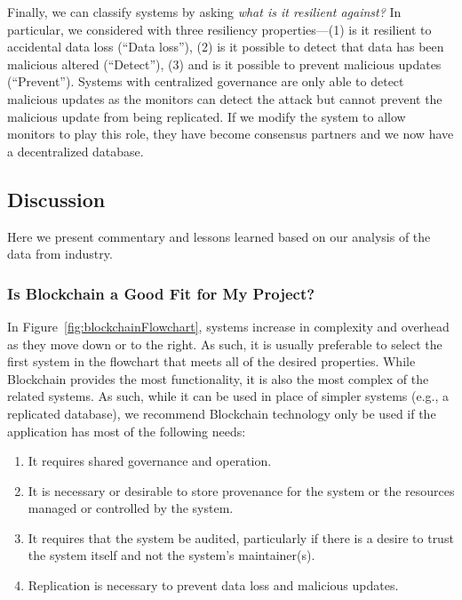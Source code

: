Finally, we can classify systems by asking \emph{what is it resilient against?}
In particular, we considered with three resiliency properties---(1) is it resilient to accidental data loss (``Data loss''), (2) is it possible to detect that data has been malicious altered (``Detect''), (3) and is it possible to prevent malicious updates (``Prevent'').
Systems with centralized governance are only able to detect malicious updates as the monitors can detect the attack but cannot prevent the malicious update from being replicated.
If we modify the system to allow monitors to play this role, they have become consensus partners and we now have a decentralized database.

\subsection{Discussion}
Here we present commentary and lessons learned based on our analysis of the data from industry.

\subsubsection{Is Blockchain a Good Fit for My Project?}
In Figure~\ref{fig:blockchainFlowchart}, systems increase in complexity and overhead as they move down or to the right.
As such, it is usually preferable to select the first system in the flowchart that meets all of the desired properties.
While Blockchain provides the most functionality, it is also the most complex of the related systems.
As such, while it can be used in place of simpler systems (e.g., a replicated database), we recommend Blockchain technology only be used if the application has most of the following needs:

\begin{enumerate}
	\item It requires shared governance and operation.
	\item It is necessary or desirable to store provenance for the system or the resources managed or controlled by the system.
	\item It requires that the system be audited, particularly if there is a desire to trust the system itself and not the system's maintainer(s).
	\item Replication is necessary to prevent data loss and malicious updates.
\end{enumerate}

